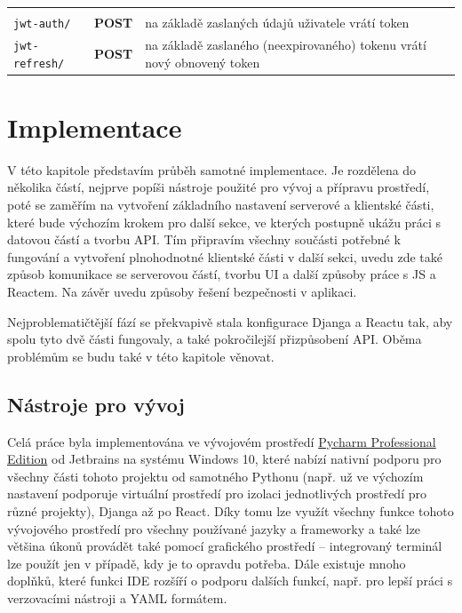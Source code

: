             {\centering
            \begin{tabular}{p{\apiA\textwidth} p{\apiB\textwidth} p{\apiC\textwidth}}&&\\
                \verb|jwt-auth/|            & \textbf{POST}     & na základě zaslaných údajů uživatele vrátí token\\
                \verb|jwt-refresh/|         & \textbf{POST}     & na základě zaslaného (neexpirovaného) tokenu vrátí nový obnovený token\\
            \end{tabular}}
            
    
\chapter{Implementace}
V této kapitole představím průběh samotné implementace. Je rozdělena do několika částí, nejprve popíši nástroje použité pro vývoj a přípravu prostředí, poté se zaměřím na vytvoření základního nastavení serverové a klientské části, které bude výchozím krokem pro další sekce, ve kterých postupně ukážu práci s datovou částí a tvorbu API. Tím připravím všechny součásti potřebné k fungování a vytvoření plnohodnotné klientské části v další sekci, uvedu zde také způsob komunikace se serverovou částí, tvorbu UI a další způsoby práce s JS a Reactem. Na závěr uvedu způsoby řešení bezpečnosti v aplikaci.

Nejproblematičtější fází se překvapivě stala konfigurace Djanga a Reactu tak, aby spolu tyto dvě části fungovaly, a také pokročilejší přizpůsobení API. Oběma problémům se budu také v této kapitole věnovat.

    \section{Nástroje pro vývoj}\label{nastrojeprovyvoj}
    Celá práce byla implementována ve vývojovém prostředí \href{https://www.jetbrains.com/pycharm/}{Pycharm Professional Edition} od Jetbrains na systému Windows 10, které nabízí nativní podporu pro všechny části tohoto projektu od samotného Pythonu (např. už ve výchozím nastavení podporuje virtuální prostředí pro izolaci jednotlivých prostředí pro různé projekty), Djanga až po React. Díky tomu lze využít všechny funkce tohoto vývojového prostředí pro všechny používané jazyky a frameworky a také lze většina úkonů provádět také pomocí grafického prostředí -- integrovaný terminál lze použít jen v případě, kdy je to opravdu potřeba. Dále existuje mnoho doplňků, které funkci IDE rozšíří o podporu dalších funkcí, např. pro lepší práci s verzovacími nástroji a YAML formátem.
    
